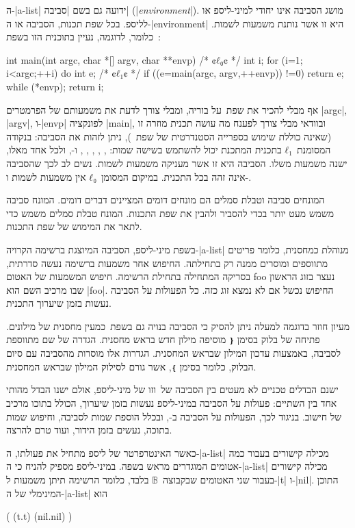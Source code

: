 ה-\E|a-list| ידועה גם בשם \ע|סביבה| (\E|\emph{environment}|). מושג הסביבה אינו
יחודי למיני-ליספ או לליספ. בכל שפת תכנות, הסביבה או ה-\E|environment| היא זו
אשר נותנת משמעות לשמות. כלומר, לדוגמה, נעיין בתוכנית הזו בשפת~\CPL:
\begin{CPP}
int main(int argc, char *[] argv, char **envp) {
  /* ¢$ℓ₀$¢ */ int i;
  for (i=1; i<argc;++i) {
    do {
      int e;
      /* ¢$ℓ₁$¢ */ if ((e=main(argc, argv,++envp)) !=0)
        return e;
    } while (*envp);
  }
  return i;
}
\end{CPP}
אף מבלי להכיר את שפת~\CPL על בוריה, ומבלי צורך לדעת את משמעותם של הפרמטרים
\E|argc|, \E|argv|, ו-\E|envp| לפונקציה \E|main|, ובוודאי מבלי צורך לפענח מה
עושה תכנית מוזרה זו (שאינה כוללת שימוש בספרייה הסטנדרטית של שפת~\CPL), ניתן
לזהות את הסביבה: בנקודה המסומנת~$ℓ₁$ בתכנית המתכנת יכול להשתמש בשישה שמות:
, , , , , ו-, ולכל
אחד מאלו, ישנה משמעות משלו. הסביבה היא זו אשר מעניקה משמעות לשמות.
נשים לב לכך שהסביבה אינה זהה בכל התכנית. במיקום המסומן~$ℓ₀$ אין משמעות
לשמות  ו-.

המונחים סביבה וטבלת סמלים הם מונחים דומים המציינים דברים דומים. המונח סביבה
משמש מעט יותר בכדי להסביר ולהבין את שפת התכנות. המונח טבלת סמלים משמש
כדי לתאר את המימוש של שפת התכנות.

בשפת מיני-ליספ, הסביבה המיוצגת ברשימה הקרויה-\E|a-list| מנוהלת כמחסנית, כלומר
פריטים מתווספים ומוסרים ממנה רק בתחילתה. החיפוש אחר משמעות ברשימה נעשה סדרתית,
בסריקה המתחילה בתחילת הרשימה. חיפוש המשמעות של האטום foo נעצר בזוג הראשון שבו
מרכיב השם הוא \E|foo|. החיפוש נכשל אם לא נמצא זוג כזה. כל הפעולות על הסביבה
נעשות בזמן שיערוך התכנית.

מעיון חוזר בדוגמה למעלה ניתן להסיק כי הסביבה בנויה גם בשפת~\CPL כמעין מחסנית
של מילונים. פתיחה של בלוק בסימן \texttt{❴} מוסיפה מילון חדש בראש מחסנית. הגדרה
של שם מתווספת לסביבה, באמצעות עדכון המילון שבראש המחסנית. הגדרות אלו מוסרות
מהסביבה עם סיום הבלוק, כלומר בסימן \texttt{❵}, אשר גורם לסילוק המילון שבראש המחסנית.

ישנם הבדלים טכניים לא מעטים בין הסביבה של~\CPL וזו של מיני-ליספ, אולם ישנו הבדל
מהותי אחד בין השתיים: פעולות על הסביבה במיני-ליספ נעשות בזמן שיערוך, הכולל בתוכו
מרכיב של חישוב. בניגוד לכך, הפעולות על הסביבה ב-\CPL, ובכלל הוספת שמות לסביבה,
וחיפוש שמות בתוכה, נעשים בזמן הידור, ועוד טרם להרצה.

כאשר האינטרפרטר של ליספ מתחיל את פעולתו, ה-\E|a-list| מכילה קישורים בעבור כמה
אטומים המוגדרים מראש בשפה. במיני-ליספ מספיק להניח כי ה-\E|a-list| מכילה קישורים
בעבור שני האטומים שבקבוצה~$𝔹$ בלבד, כלומר הרשימה תיתן משמעות ל-\E|t| ו-\E|nil|.
התוכן המינימלי של ה-\E|a-list| הוא
\begin{LISP}
(
  (t.t)
  (nil.nil)
)
\end{LISP}

